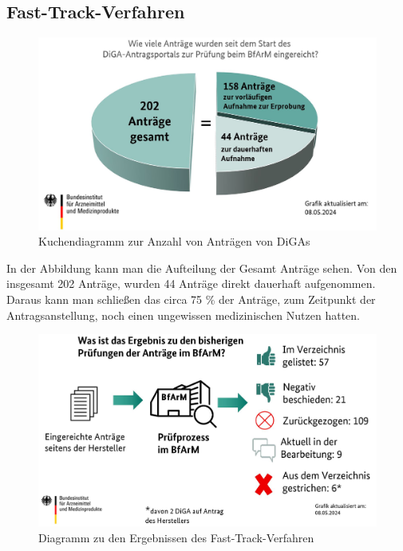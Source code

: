 \documentclass{article}
\begin{document}
		\subsection{Fast-Track-Verfahren} 
			\begin{figure}[htbp]
				\includegraphics[width=\textwidth]{./grafiken/Anzahl_Antraege_DiGA}
				\caption[Anzahl Anträge von DiGAs]{Kuchendiagramm zur Anzahl von Anträgen von DiGAs}
				\label{Abb-antragsanzahl-diga}
			\end{figure}
			In der Abbildung kann man die Aufteilung der Gesamt Anträge sehen. Von den insgesamt 202 Anträge, wurden 44 Anträge direkt dauerhaft aufgenommen. Daraus kann man schließen das circa 75 \% der Anträge, zum Zeitpunkt der Antragsanstellung, noch einen ungewissen medizinischen Nutzen hatten.
			\newpage
			\begin{figure}[htbp]
				\includegraphics[width=\textwidth]{./grafiken/Ergebnis_Pruefungen_DiGA}
				\caption[Abbildung zu den Ergebnissen des Fast-Track-Verfahren]{Diagramm zu den Ergebnissen des Fast-Track-Verfahren}
				\label{Abb-ergebnisse-ft}
			\end{figure} 
\end{document}
